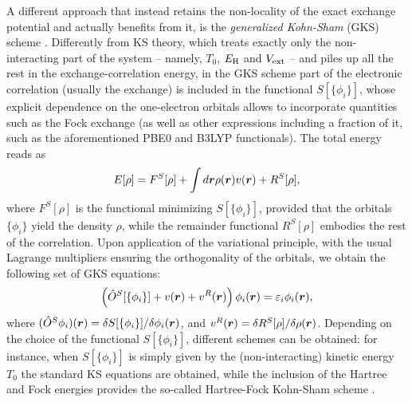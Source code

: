 A different approach that instead retains the non-locality of the exact exchange potential and actually benefits from it, is the \emph{generalized Kohn-Sham} (GKS) scheme \cite{seidl_generalized_1996}. Differently from KS theory, which treats exactly only the non-interacting part of the system -- namely, $T_0$, $E_{\rm H}$ and $V_{\rm ext}$ -- and piles up all the rest in the exchange-correlation energy, in the GKS scheme part of the electronic correlation (usually the exchange) is included in the functional $S[\{ \phi_i \}]$, whose explicit dependence on the one-electron orbitals allows to incorporate quantities such as the Fock exchange (as well as other expressions including a fraction of it, such as the aforementioned PBE0 and B3LYP functionals). The total energy reads as
%
\begin{equation}
    E[\rho] = F^{S}[\rho] + \int d{\bm r} \rho({\bm r}) v({\bm r}) + R^{S}[\rho] ,
    \label{eq:gks-energy}
\end{equation}
%
where $F^{S}[\rho]$ is the functional minimizing $S[\{ \phi_i \}]$, provided that the orbitals $\{ \phi_i \}$ yield the density $\rho$, while the remainder functional $R^{S}[\rho]$ embodies the rest of the correlation. Upon application of the variational principle, with the usual Lagrange multipliers ensuring the orthogonality of the orbitals, we obtain the following set of GKS equations:
%
\begin{equation}
    \left( \hat{O}^S[\{ \phi_i \}] + v({\bm r}) + v^R({\bm r}) \right) \phi_i({\bm r}) = \varepsilon_i \phi_i({\bm r}) ,
    \label{eq:gks-equations}
\end{equation}
%
where $(\hat{O}^S \phi_i)({\bm r}) = \delta S[\{ \phi_i \}] / \delta \phi_i({\bm r})$, and $v^R({\bm r}) = \delta R^S[\rho] / \delta \rho({\bm r})$. Depending on the choice of the functional $S[\{ \phi_i \}]$, different schemes can be obtained: for instance, when $S[\{ \phi_i \}]$ is simply given by the (non-interacting) kinetic energy $T_0$ the standard KS equations are obtained, while the inclusion of the Hartree and Fock energies provides the so-called Hartree-Fock Kohn-Sham scheme \cite{seidl_generalized_1996}.

